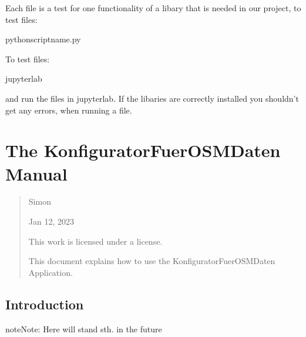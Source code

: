 \documentclass[letterpaper,10pt,english]{sphinxmanual}
\begin{document}
\sphinxAtStartPar
Each file is a test for one functionality of a libary that is needed in our project,
to test  files:

\begin{sphinxVerbatim}[commandchars=\\\{\}]
pythonscript\PYGZus{}name.py
\end{sphinxVerbatim}

\sphinxAtStartPar
To test  files:

\begin{sphinxVerbatim}[commandchars=\\\{\}]
jupyter\PYGZhy{}lab
\end{sphinxVerbatim}

\sphinxAtStartPar
and run the files in jupyter\sphinxhyphen{}lab. If the libaries are correctly installed you shouldn’t
get any errors, when running a file.

\sphinxstepscope


\section{The KonfiguratorFuerOSMDaten Manual}
\label{\detokenize{manual:the-konfiguratorfuerosmdaten-manual}}\label{\detokenize{manual:manual}}\label{\detokenize{manual::doc}}\begin{quote}\begin{description}
\sphinxAtStartPar
Simon


\sphinxAtStartPar
Jan 12, 2023

\sphinxAtStartPar
This work is licensed under a  license.

\sphinxAtStartPar
This document explains how to use the KonfiguratorFuerOSMDaten Application.

\end{description}\end{quote}


\subsection{Introduction}
\label{\detokenize{manual:introduction}}\label{\detokenize{manual:intro}}
\begin{sphinxadmonition}{note}{Note:}
\sphinxAtStartPar
Here will stand sth. in the future
\end{sphinxadmonition}
\end{document}
